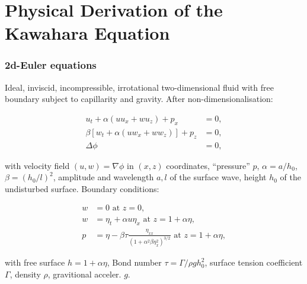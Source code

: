 \documentclass[pdftex,10pt,intlimits]{beamer}
\begin{document}
\section{Physical Derivation of the Kawahara Equation}

\begin{frame}
  \frametitle{2d-Euler equations}
  Ideal, inviscid, incompressible, irrotational two-dimensional fluid with free boundary subject to capillarity and
gravity. After non-dimensionalisation:
\begin{block}{}
\begin{equation*}\begin{aligned}
  u_t + \alpha(uu_x + wu_z) + p_x &= 0,\\
 \beta [w_t + \alpha(uw_x + ww_z)] + p_z &=0,\\
 \Delta \phi &= 0,
\end{aligned}\end{equation*}
\end{block}
with velocity field $(u,w)=\nabla\phi$ in $(x,z)$ coordinates, ``pressure'' $p$, $\alpha=a/h_0$, $\beta=(h_0/l)^2$,
amplitude and wavelength $a,l$ of the surface wave, height $h_0$ of the undisturbed surface. Boundary conditions:
\begin{block}{}
\begin{equation*}\begin{aligned}
  w&=0 \mbox{ at } z=0,\\
  w&=\eta_t+\alpha u\eta_x\mbox{ at } z=1+\alpha\eta,\\
  p&=\eta - \beta\tau\frac{\eta_{xx}}{(1+\alpha^2\beta\eta_x^2)^{3/2}}\mbox{ at } z=1+\alpha\eta,
\end{aligned}\end{equation*}
\end{block}
with free surface $h=1 + \alpha\eta$, Bond number $\tau=\Gamma/\rho g h_0^2$, surface tension coefficient $\Gamma$,
density $\rho$, gravitional acceler. $g$.
\end{frame}
\end{document}
